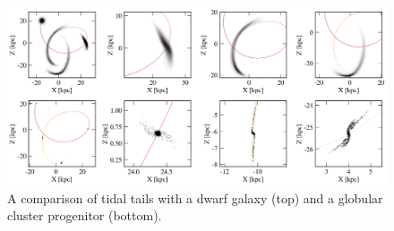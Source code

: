 \documentclass[final,5p,times,twocolumn,authoryear]{elsarticle}
\begin{document}
\begin{figure}[t!]
\begin{center}
\includegraphics[width=1\textwidth]{figures/stream_formation.png}
\end{center}
\caption{%
A comparison of tidal tails with a dwarf galaxy (top) and a globular cluster progenitor (bottom).
\label{fig:stream_formation}
}
\end{figure}
\end{document}
